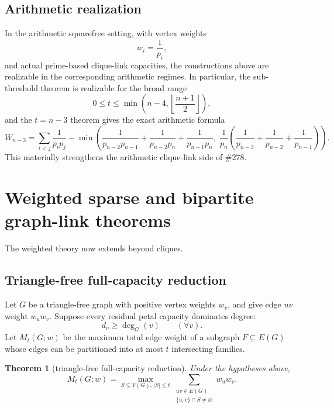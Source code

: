 \documentclass[11pt]{article}
\newtheorem{theorem}{Theorem}[section]
\theoremstyle{definition}
\begin{document}
\subsection{Arithmetic realization}
In the arithmetic squarefree setting, with vertex weights
\[
w_i=\frac1{p_i},
\]
and actual prime-based clique-link capacities, the constructions above are realizable in the corresponding arithmetic regimes. In particular, the sub-threshold theorem is realizable for the broad range
\[
0\le t\le \min\!\left(n-4,\left\lfloor\frac{n+1}{2}\right\rfloor\right),
\]
and the \(t=n-3\) theorem gives the exact arithmetic formula
\[
W_{n-3}=
\sum_{i<j}\frac1{p_ip_j}
-
\min\!\left(
\frac1{p_{n-2}p_{n-1}}+\frac1{p_{n-2}p_n}+\frac1{p_{n-1}p_n},
\;
\frac1{p_n}\left(\frac1{p_{n-3}}+\frac1{p_{n-2}}+\frac1{p_{n-1}}\right)
\right).
\]
This materially strengthens the arithmetic clique-link side of \#278.

\section{Weighted sparse and bipartite graph-link theorems}
The weighted theory now extends beyond cliques.

\subsection{Triangle-free full-capacity reduction}
Let \(G\) be a triangle-free graph with positive vertex weights \(w_v\), and give edge \(uv\) weight \(w_uw_v\). Suppose every residual petal capacity dominates degree:
\[
d_v\ge \deg_G(v)\qquad(\forall v).
\]
Let \(M_t(G;w)\) be the maximum total edge weight of a subgraph \(F\subseteq E(G)\) whose edges can be partitioned into at most \(t\) intersecting families.

\begin{theorem}[triangle-free full-capacity reduction]\label{thm:trianglefree-coverage}
Under the hypotheses above,
\[
M_t(G;w)=
\max_{S\subseteq V(G),\,|S|\le t}
\sum_{\substack{uv\in E(G)\\ \{u,v\}\cap S\neq\varnothing}} w_uw_v.
\]
\end{theorem}
\end{document}
